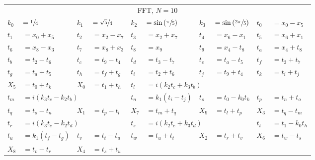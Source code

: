 \begin{tabular}{|p{4.3pt}l|p{4.3pt}l|p{4.3pt}l|p{4.3pt}l|p{4.3pt}l|}\toprule \multicolumn{10}{|c|}{FFT, $N=10$} \\
$k_0 $ &$= \sfrac{1}{4}$ & $k_1 $ &$= \sfrac{\sqrt{5}}{4}$ & $k_2 $ &$= \sin\left(\sfrac{\pi}{5}\right)$ & $k_3 $ &$= \sin\left(\sfrac{2\pi}{5}\right)$ & $t_0 $ &$= x_0 - x_5$\\ 
$t_1 $ &$= x_0 + x_5$ & $t_2 $ &$= x_2 - x_7$ & $t_3 $ &$= x_2 + x_7$ & $t_4 $ &$= x_6 - x_1$ & $t_5 $ &$= x_6 + x_1$\\ 
$t_6 $ &$= x_8 - x_3$ & $t_7 $ &$= x_8 + x_3$ & $t_8 $ &$= x_9$ & $t_9 $ &$= x_4 - t_8$ & $t_a $ &$= x_4 + t_8$\\ 
$t_b $ &$= t_2 - t_6$ & $t_c $ &$= t_9 - t_4$ & $t_d $ &$= t_3 - t_7$ & $t_e $ &$= t_a - t_5$ & $t_f $ &$= t_3 + t_7$\\ 
$t_g $ &$= t_a + t_5$ & $t_h $ &$= t_f + t_g$ & $t_i $ &$= t_2 + t_6$ & $t_j $ &$= t_9 + t_4$ & $t_k $ &$= t_i + t_j$\\ 
$X_5 $ &$= t_0 + t_k$ & $X_0 $ &$= t_1 + t_h$ & $t_l $ &\multicolumn{5}{l|}{$= i(k_2t_c + k_3t_b)$}\\ 
$t_m $ &\multicolumn{3}{l|}{$= i(k_3t_c - k_2t_b)$} & $t_n $ &$= k_1(t_i - t_j)$ & $t_o $ &$= t_0 - k_0t_k$ & $t_p $ &$= t_n + t_o$\\ 
$t_q $ &$= t_o - t_n$ & $X_1 $ &$= t_p - t_l$ & $X_7 $ &$= t_m + t_q$ & $X_9 $ &$= t_l + t_p$ & $X_3 $ &$= t_q - t_m$\\ 
$t_r $ &\multicolumn{3}{l|}{$= i(k_3t_e - k_2t_d)$} & $t_s $ &\multicolumn{3}{l|}{$= i(k_2t_e + k_3t_d)$} & $t_t $ &$= t_1 - k_0t_h$\\ 
$t_u $ &$= k_1(t_f - t_g)$ & $t_v $ &$= t_t - t_u$ & $t_w $ &$= t_u + t_t$ & $X_2 $ &$= t_r + t_v$ & $X_6 $ &$= t_w - t_s$\\ 
$X_8 $ &$= t_v - t_r$ & $X_4 $ &\multicolumn{7}{l|}{$= t_s + t_w$}\\ 
\bottomrule\end{tabular}
